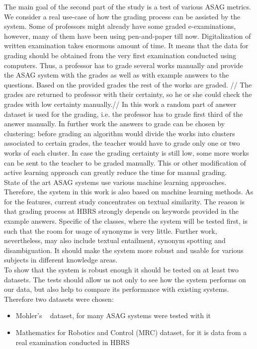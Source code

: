 The main goal of the second part of the study is a test of various ASAG metrics. We consider a real use-case of how the grading process can be assisted by the system. Some of professors might already have some graded e-examinations, however, many of them have been using pen-and-paper till now. Digitalization of written examination takes enormous amount of time. It means that the data for grading should be obtained from the very first examination conducted using computers. Thus, a professor has to grade several works manually and provide the ASAG system with the grades as well as with example answers to the questions. Based on the provided grades the rest of the works are graded. // The grades are returned to professor with their certainty, so he or she could check the grades with low certainty manually.// In this work a random part of answer dataset is used for the grading, i.e. the professor has to grade first third of the answer manually. In further work the answers to grade can be chosen by clustering: before grading an algorithm would divide the works into clusters associated to certain grades, the teacher would have to grade only one or two works of each cluster. In case the grading certainty is still low, some more works can be sent to the teacher to be graded manually. This or other modification of active learning approach can greatly reduce the time for manual grading. \\

State of the art ASAG systems use various machine learning approaches. Therefore, the system in this work is also based on machine learning methods. As for the features, current study concentrates on textual similarity. The reason is that grading process at HBRS strongly depends on keywords provided in the example answers. Specific of the classes, where the system will be tested first, is such that the room for usage of synonyms is very little. Further work, nevertheless, may also include textual entailment, synonym spotting and disambiguation. It should make the system more robust and usable for various subjects in different knowledge areas.\\

To show that the system is robust enough it should be tested on at least two datasets. The tests should allow us not only to see how the system performs on our data, but also help to compare its performance with existing systems. Therefore two datasets were chosen:
\begin{itemize}
\item Mohler's ~\cite{Mohler} dataset, for many ASAG systems were tested with it
\item Mathematics for Robotics and Control (MRC) dataset, for it is data from a real examination conducted in HBRS
\end{itemize} 
 
